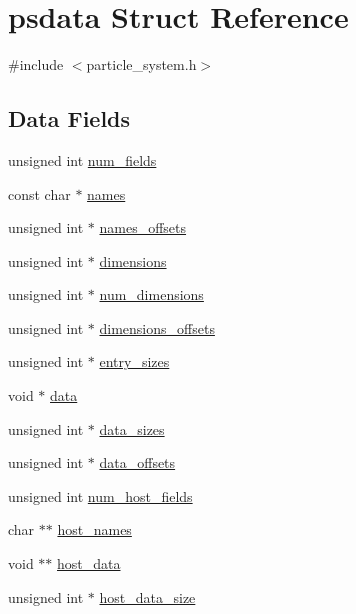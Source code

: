 \hypertarget{structpsdata}{}\section{psdata Struct Reference}
\label{structpsdata}


{\ttfamily \#include $<$particle\+\_\+system.\+h$>$}

\subsection*{Data Fields}
\begin{DoxyCompactItemize}
\item 
unsigned int \hyperlink{structpsdata_a0c5e8cc0fa3042e37da915f97e76dce8}{num\+\_\+fields}
\item 
const char $\ast$ \hyperlink{structpsdata_abfced381a51f5864ab1aaf14f40297ac}{names}
\item 
unsigned int $\ast$ \hyperlink{structpsdata_ad23c8933cb2b7ffd4f44be8d058e73d1}{names\+\_\+offsets}
\item 
unsigned int $\ast$ \hyperlink{structpsdata_a9e5bdb18e75953accfd17efe2c1154ad}{dimensions}
\item 
unsigned int $\ast$ \hyperlink{structpsdata_ad8e436c4ea05c896d8efb2a79ae7bb18}{num\+\_\+dimensions}
\item 
unsigned int $\ast$ \hyperlink{structpsdata_a889d0e2c4ab295832a0480cc6d149619}{dimensions\+\_\+offsets}
\item 
unsigned int $\ast$ \hyperlink{structpsdata_ac507921034797a74a9f5789e70166179}{entry\+\_\+sizes}
\item 
void $\ast$ \hyperlink{structpsdata_aec5fdd50200a11795db62f21f2fedbe7}{data}
\item 
unsigned int $\ast$ \hyperlink{structpsdata_a80714eccad0f11f36babbbaf7360364b}{data\+\_\+sizes}
\item 
unsigned int $\ast$ \hyperlink{structpsdata_a372c86d30fafae1b30546d20f02cf982}{data\+\_\+offsets}
\item 
unsigned int \hyperlink{structpsdata_a4b71cba344ccd849f7ae01779b9338a7}{num\+\_\+host\+\_\+fields}
\item 
char $\ast$$\ast$ \hyperlink{structpsdata_a8209dbc814fce6a98341f682d92581a9}{host\+\_\+names}
\item 
void $\ast$$\ast$ \hyperlink{structpsdata_aa7f64559ff6379b1cbc744634687dc26}{host\+\_\+data}
\item 
unsigned int $\ast$ \hyperlink{structpsdata_ae9e934a711b985fee410829e02acedc9}{host\+\_\+data\+\_\+size}
\end{DoxyCompactItemize}


